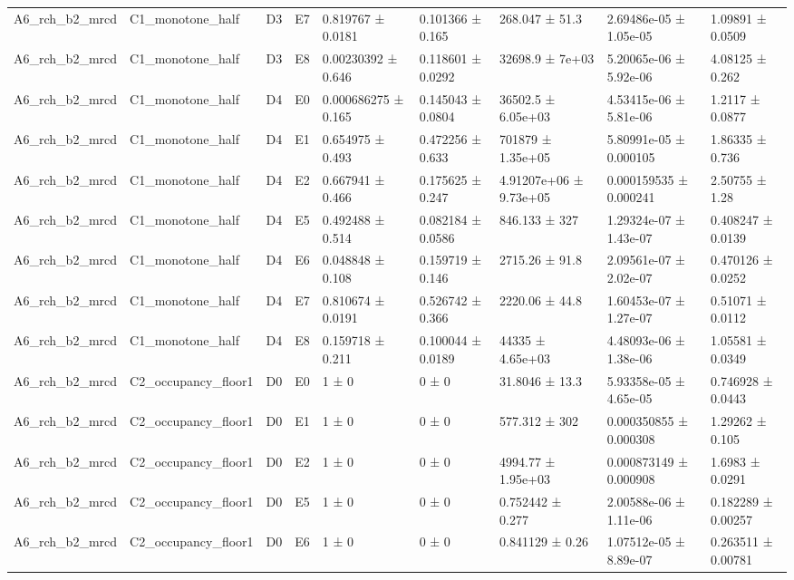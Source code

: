 \begin{table}
\begin{tabular}{lllllllll}
A6\_rch\_b2\_mrcd & C1\_monotone\_half & D3 & E7 & 0.819767 ± 0.0181 & 0.101366 ± 0.165 & 268.047 ± 51.3 & 2.69486e-05 ± 1.05e-05 & 1.09891 ± 0.0509 \\
A6\_rch\_b2\_mrcd & C1\_monotone\_half & D3 & E8 & 0.00230392 ± 0.646 & 0.118601 ± 0.0292 & 32698.9 ± 7e+03 & 5.20065e-06 ± 5.92e-06 & 4.08125 ± 0.262 \\
A6\_rch\_b2\_mrcd & C1\_monotone\_half & D4 & E0 & 0.000686275 ± 0.165 & 0.145043 ± 0.0804 & 36502.5 ± 6.05e+03 & 4.53415e-06 ± 5.81e-06 & 1.2117 ± 0.0877 \\
A6\_rch\_b2\_mrcd & C1\_monotone\_half & D4 & E1 & 0.654975 ± 0.493 & 0.472256 ± 0.633 & 701879 ± 1.35e+05 & 5.80991e-05 ± 0.000105 & 1.86335 ± 0.736 \\
A6\_rch\_b2\_mrcd & C1\_monotone\_half & D4 & E2 & 0.667941 ± 0.466 & 0.175625 ± 0.247 & 4.91207e+06 ± 9.73e+05 & 0.000159535 ± 0.000241 & 2.50755 ± 1.28 \\
A6\_rch\_b2\_mrcd & C1\_monotone\_half & D4 & E5 & 0.492488 ± 0.514 & 0.082184 ± 0.0586 & 846.133 ± 327 & 1.29324e-07 ± 1.43e-07 & 0.408247 ± 0.0139 \\
A6\_rch\_b2\_mrcd & C1\_monotone\_half & D4 & E6 & 0.048848 ± 0.108 & 0.159719 ± 0.146 & 2715.26 ± 91.8 & 2.09561e-07 ± 2.02e-07 & 0.470126 ± 0.0252 \\
A6\_rch\_b2\_mrcd & C1\_monotone\_half & D4 & E7 & 0.810674 ± 0.0191 & 0.526742 ± 0.366 & 2220.06 ± 44.8 & 1.60453e-07 ± 1.27e-07 & 0.51071 ± 0.0112 \\
A6\_rch\_b2\_mrcd & C1\_monotone\_half & D4 & E8 & 0.159718 ± 0.211 & 0.100044 ± 0.0189 & 44335 ± 4.65e+03 & 4.48093e-06 ± 1.38e-06 & 1.05581 ± 0.0349 \\
A6\_rch\_b2\_mrcd & C2\_occupancy\_floor1 & D0 & E0 & 1 ± 0 & 0 ± 0 & 31.8046 ± 13.3 & 5.93358e-05 ± 4.65e-05 & 0.746928 ± 0.0443 \\
A6\_rch\_b2\_mrcd & C2\_occupancy\_floor1 & D0 & E1 & 1 ± 0 & 0 ± 0 & 577.312 ± 302 & 0.000350855 ± 0.000308 & 1.29262 ± 0.105 \\
A6\_rch\_b2\_mrcd & C2\_occupancy\_floor1 & D0 & E2 & 1 ± 0 & 0 ± 0 & 4994.77 ± 1.95e+03 & 0.000873149 ± 0.000908 & 1.6983 ± 0.0291 \\
A6\_rch\_b2\_mrcd & C2\_occupancy\_floor1 & D0 & E5 & 1 ± 0 & 0 ± 0 & 0.752442 ± 0.277 & 2.00588e-06 ± 1.11e-06 & 0.182289 ± 0.00257 \\
A6\_rch\_b2\_mrcd & C2\_occupancy\_floor1 & D0 & E6 & 1 ± 0 & 0 ± 0 & 0.841129 ± 0.26 & 1.07512e-05 ± 8.89e-07 & 0.263511 ± 0.00781 \\

\end{tabular}
\end{table}
